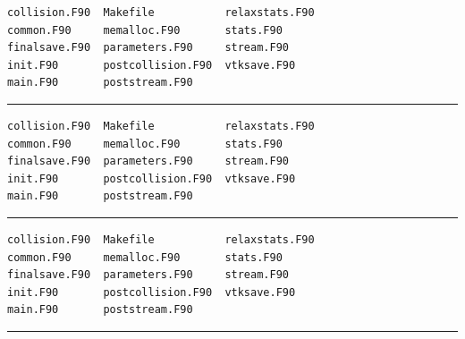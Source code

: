 \documentclass[12pt]{report}
\begin{document}
\vspace{-1em}

\begin{verbatim}
collision.F90  Makefile           relaxstats.F90
common.F90     memalloc.F90       stats.F90
finalsave.F90  parameters.F90     stream.F90
init.F90       postcollision.F90  vtksave.F90
main.F90       poststream.F90
\end{verbatim}
\hrule\vspace{1em}

\vspace{-1em}

\begin{verbatim}
collision.F90  Makefile           relaxstats.F90
common.F90     memalloc.F90       stats.F90
finalsave.F90  parameters.F90     stream.F90
init.F90       postcollision.F90  vtksave.F90
main.F90       poststream.F90
\end{verbatim}
\hrule\vspace{1em}

\vspace{-1em}

\begin{verbatim}
collision.F90  Makefile           relaxstats.F90
common.F90     memalloc.F90       stats.F90
finalsave.F90  parameters.F90     stream.F90
init.F90       postcollision.F90  vtksave.F90
main.F90       poststream.F90
\end{verbatim}
\hrule\vspace{1em}

\vspace{-1em}
\end{document}

